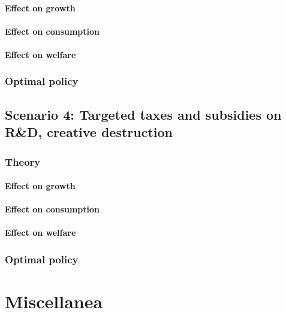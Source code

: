 \documentclass[11pt,english]{article}
\theoremstyle{remark}
\begin{document}
\paragraph{Effect on growth}

\paragraph{Effect on consumption}

\paragraph{Effect on welfare}

\subsubsection{Optimal policy}

\subsection{Scenario 4: Targeted taxes and subsidies on R\&D, creative destruction}

\subsubsection{Theory}

\paragraph{Effect on growth}

\paragraph{Effect on consumption}

\paragraph{Effect on welfare}

\subsubsection{Optimal policy}





\appendix

\section{Miscellanea}
\end{document}
